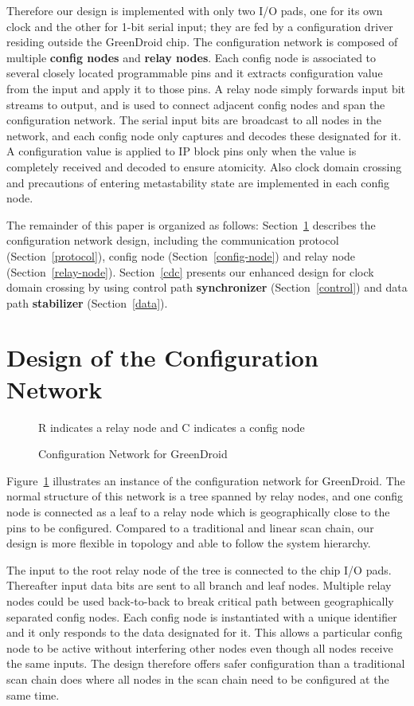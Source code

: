 \documentclass[12pt]{article}
\newcommand{\reffig}[1]{Figure~\ref{#1}}
\newcommand{\refsec}[1]{Section~\ref{#1}}
\begin{document}
Therefore our design is implemented with only two I/O pads, one for its own
clock and the other for 1-bit serial input; they are fed by a configuration
driver residing outside the GreenDroid chip. The configuration network is
composed of multiple \textbf{config nodes} and \textbf{relay nodes}. Each
config node is associated to several closely located programmable pins and it
extracts configuration value from the input and apply it to those pins. A relay
node simply forwards input bit streams to output, and is used to connect
adjacent config nodes and span the configuration network. The serial input bits
are broadcast to all nodes in the network, and each config node only captures
and decodes these designated for it. A configuration value is applied to IP
block pins only when the value is completely received and decoded to ensure
atomicity. Also clock domain crossing and precautions of entering metastability
state are implemented in each config node.

The remainder of this paper is organized as follows: \refsec{design} describes
the configuration network design, including the communication protocol
(\refsec{protocol}), config node (\refsec{config-node}) and relay node
(\refsec{relay-node}). \refsec{cdc} presents our enhanced design for
clock domain crossing by using control path \textbf{synchronizer}
(\refsec{control}) and data path \textbf{stabilizer} (\refsec{data}).

\section{Design of the Configuration Network} \label{design}

\begin{figure}[h]
\centering

\caption{Configuration Network for GreenDroid}{R indicates a relay node and C indicates a config node}
\label{fig:config-net}
\end{figure}

\reffig{fig:config-net} illustrates an instance of the configuration network
for GreenDroid. The normal structure of this network is a tree spanned by relay
nodes, and one config node is connected as a leaf to a relay node which is
geographically close to the pins to be configured. Compared to a traditional
and linear scan chain, our design is more flexible in topology and able to
follow the system hierarchy.

The input to the root relay node of the tree is connected to the chip I/O pads.
Thereafter input data bits are sent to all branch and leaf nodes.
Multiple relay nodes could be used back-to-back to break critical path between
geographically separated config nodes. Each config node is instantiated with a
unique identifier and it only responds to the data designated for it. This
allows a particular config node to be active without interfering other nodes
even though all nodes receive the same inputs. The design therefore offers
safer configuration than a traditional scan chain does where all nodes in the
scan chain need to be configured at the same time.
\end{document}
